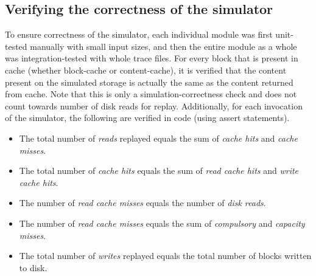 \subsection{Verifying the correctness of the simulator}
To ensure correctness of the simulator, each individual module was
first unit-tested manually with small input sizes, and then the entire
module as a whole was integration-tested with whole trace files. 
For every block that is present in cache (whether block-cache 
or content-cache), it is verified that the content present on the 
simulated storage is actually the same as the content returned from
cache. Note that this is only a simulation-correctness check and does not 
count towards number of disk reads for replay.
Additionally, for each invocation of the simulator, the following are 
verified in code (using assert statements).
\begin{itemize}
\item The total number of \textit{reads} replayed equals the sum of 
\textit{cache hits} and \textit{cache misses}.
\item The total number of \textit{cache hits} equals the sum of 
\textit{read cache hits} and \textit{write cache hits}.
\item The number of \textit{read cache misses} equals the number
of \textit{disk reads}.
\item The number of \textit{read cache misses} equals the sum of
\textit{compulsory} and \textit{capacity misses}.
\item The total number of \textit{writes} replayed equals the total number
of blocks written to disk.
\end{itemize}
